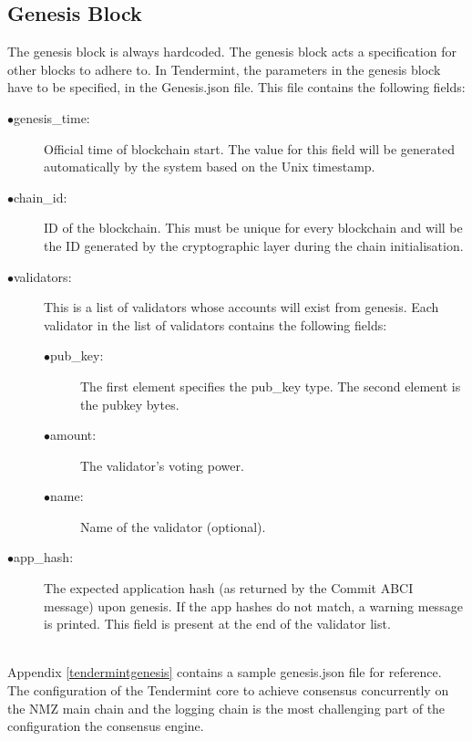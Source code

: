 \documentclass[a4paper,twoside,phd]{BYUPhys}
\begin{document}
\subsection{Genesis Block}
The genesis block is always hardcoded\cite{2018GenesisWiki}. The genesis block acts a specification for other blocks to adhere to. In Tendermint, the parameters in the genesis block have to be specified, in the Genesis.json file. This file contains the following fields:
\begin{description}
\item[$\bullet$genesis\_time:]Official time of blockchain start. The value for this field will be generated automatically by the system based on the Unix timestamp.
\item[$\bullet$chain\_id:] ID of the blockchain. This must be unique for every blockchain and will be the ID generated by the cryptographic layer during the chain initialisation.
\item[$\bullet$validators:] This is a list of validators whose accounts will exist from genesis. Each validator in the list of validators contains the following fields:
\begin{description}
\item[$\bullet$pub\_key:]The first element specifies the pub\_key type. The second element is the pubkey bytes.
\item[$\bullet$amount:]The validator’s voting power.
\item[$\bullet$name:]Name of the validator (optional).
\end{description}

\item[$\bullet$app\_hash:]The expected application hash (as returned by the Commit ABCI message) upon genesis. If the app hashes do not match, a warning message is printed. This field is present at the end of the validator list.
\\
\\
\end{description}
Appendix \ref{tendermintgenesis} contains a sample genesis.json file for reference. The configuration of the Tendermint core to achieve consensus concurrently on the NMZ main chain and the logging chain is the most challenging part of the configuration the consensus engine.
\end{document}
